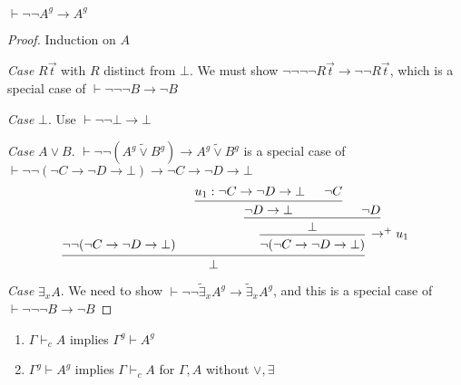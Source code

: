 \documentclass[11pt]{article}
\def \texists {\tilde{\exists}}
\def \tvee {\tilde{\vee}}
\begin{document}
\begin{lemma}[]
\(\vdash\neg\neg A^g\to A^g\)
\end{lemma}

\begin{proof}
Induction on \(A\)

\emph{Case} \(R\vec{t}\) with \(R\) distinct from \(\bot\). We must show
\(\neg\neg\neg\neg R\vec{t}\to\neg\neg R\vec{t}\), which is a special case of
\(\vdash\neg\neg\neg B\to\neg B\)

\emph{Case} \(\bot\). Use \(\vdash\neg\neg\bot\to\bot\)

\emph{Case} \(A\vee B\). \(\vdash\neg\neg(A^g\tvee B^g)\to A^g\tvee B^g\) is a special
case of \(\vdash\neg\neg(\neg C\to \neg D\to\bot)\to\neg C\to\neg D\to\bot\)
\begin{equation*}
\begin{prooftree}[center=false]
\hypo{\neg\neg(\neg C\to\neg D\to\bot)}
\hypo{u_1:\neg C\to\neg D\to\bot}
\hypo{\neg C}
\infer2{\neg D\to\bot}
\hypo{\neg D}
\infer2{\bot}
\infer1[\(\to^+u_1\)]{\neg(\neg C\to\neg D\to\bot)}
\infer2{\bot}
\end{prooftree}
\end{equation*}

\emph{Case} \(\exists_xA\). We need to show
\(\vdash\neg\neg\texists_xA^g\to\texists_xA^g\), and this is a special case
of \(\vdash\neg\neg\neg B\to\neg B\)
\end{proof}

\begin{theorem}[]
\begin{enumerate}
\item \(\Gamma\vdash_c A\) implies \(\Gamma^g\vdash A^g\)
\item \(\Gamma^g\vdash A^g\) implies \(\Gamma\vdash_c A\) for \(\Gamma,A\) without \(\vee,\exists\)
\end{enumerate}
\end{theorem}
\end{document}
